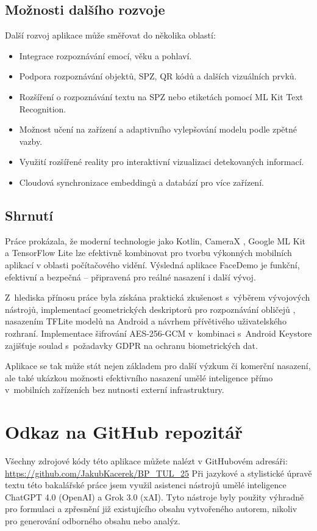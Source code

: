 \documentclass[FM,BP,CZ]{tulthesis}
\begin{document}
\section{Možnosti dalšího rozvoje}
Další rozvoj aplikace může směřovat do několika oblastí:
\begin{itemize}
    \item Integrace rozpoznávání emocí, věku a pohlaví.
    \item Podpora rozpoznávání objektů, SPZ, QR kódů a dalších vizuálních prvků.
    \item Rozšíření o rozpoznávání textu na SPZ nebo etiketách pomocí ML Kit Text Recognition.
    \item Možnost učení na zařízení a adaptivního vylepšování modelu podle zpětné vazby.
    \item Využití rozšířené reality pro interaktivní vizualizaci detekovaných informací.
    \item Cloudová synchronizace embeddingů a databází pro více zařízení.
\end{itemize}
\section{Shrnutí}
Práce prokázala, že moderní technologie jako Kotlin, CameraX \cite{camerax2024}, Google ML Kit \cite{googlemlkit2024} a TensorFlow Lite \cite{tensorflow2015whitepaper} lze efektivně kombinovat pro tvorbu výkonných mobilních aplikací v oblasti počítačového vidění. Výsledná aplikace FaceDemo je funkční, efektivní a bezpečná -- připravená pro reálné nasazení i další vývoj.

Z~hlediska přínosu práce byla získána praktická zkušenost s~výběrem vývojových nástrojů, implementací geometrických deskriptorů pro rozpoznávání obličejů \cite{wang2021survey}, nasazením TFLite modelů na Android a návrhem přívětivého uživatelského rozhraní. Implementace šifrování AES-256-GCM \cite{nist2001aes} v~kombinaci s~Android Keystore \cite{androidkeystore2024} zajišťuje soulad s~požadavky GDPR \cite{gdpr2016} na ochranu biometrických dat.

Aplikace se tak může stát nejen základem pro další výzkum či komerční nasazení, ale také ukázkou možnosti efektivního nasazení umělé inteligence \cite{goodfellow2016deeplearning} přímo v~mobilních zařízeních bez nutnosti externí infrastruktury.
\printbibliography[title={Použitá literatura}, heading=bibintoc]
\listoffigures
\chapter*{Odkaz na GitHub repozitář}
Všechny zdrojové kódy této aplikace můžete nalézt v GitHubovém adresáři:\newline
\url{https://github.com/JakubKacerek/BP_TUL_25}
\newline
\newline
Při jazykové a stylistické úpravě textu této bakalářské práce jsem využil asistenci nástrojů umělé inteligence ChatGPT 4.0 (OpenAI) a Grok 3.0 (xAI). Tyto nástroje byly použity výhradně pro formulaci a zpřesnění již existujícího obsahu vytvořeného autorem, nikoliv pro generování odborného obsahu nebo analýz.
\end{document}
